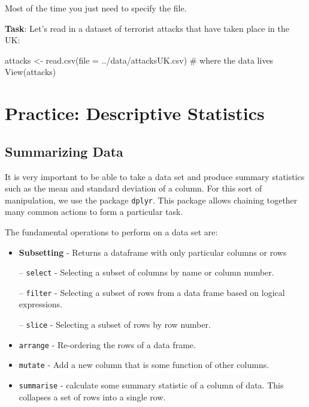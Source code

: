 \documentclass[
  letterpaper,
  DIV=11,
  numbers=noendperiod]{scrreprt}
\newenvironment{Shaded}{\begin{snugshade}}{\end{snugshade}}
\newcommand{\AttributeTok}[1]{\textcolor[rgb]{0.40,0.45,0.13}{#1}}
\newcommand{\CommentTok}[1]{\textcolor[rgb]{0.37,0.37,0.37}{#1}}
\newcommand{\FunctionTok}[1]{\textcolor[rgb]{0.28,0.35,0.67}{#1}}
\newcommand{\NormalTok}[1]{\textcolor[rgb]{0.00,0.23,0.31}{#1}}
\newcommand{\OtherTok}[1]{\textcolor[rgb]{0.00,0.23,0.31}{#1}}
\newcommand{\StringTok}[1]{\textcolor[rgb]{0.13,0.47,0.30}{#1}}
\begin{document}
Most of the time you just need to specify the file.

\textbf{Task}: Let's read in a dataset of terrorist attacks that have
taken place in the UK:

\begin{Shaded}
\begin{Highlighting}[]
\NormalTok{attacks }\OtherTok{\textless{}{-}} \FunctionTok{read.csv}\NormalTok{(}\AttributeTok{file   =} \StringTok{\textquotesingle{}../data/attacksUK.csv\textquotesingle{}}\NormalTok{)  }\CommentTok{\# where the data lives                                 }
\FunctionTok{View}\NormalTok{(attacks)}
\end{Highlighting}
\end{Shaded}

\section{Practice: Descriptive
Statistics}\label{practice-descriptive-statistics}

\subsection{Summarizing Data}\label{summarizing-data}

It is very important to be able to take a data set and produce summary
statistics such as the mean and standard deviation of a column. For this
sort of manipulation, we use the package \texttt{dplyr}. This package
allows chaining together many common actions to form a particular task.

The fundamental operations to perform on a data set are:

\begin{itemize}
\item
  \textbf{Subsetting} - Returns a dataframe with only particular columns
  or rows

  -- \texttt{select} - Selecting a subset of columns by name or column
  number.

  -- \texttt{filter} - Selecting a subset of rows from a data frame
  based on logical expressions.

  -- \texttt{slice} - Selecting a subset of rows by row number.
\item
  \texttt{arrange} - Re-ordering the rows of a data frame.
\item
  \texttt{mutate} - Add a new column that is some function of other
  columns.
\item
  \texttt{summarise} - calculate some summary statistic of a column of
  data. This collapses a set of rows into a single row.
\end{itemize}
\end{document}
